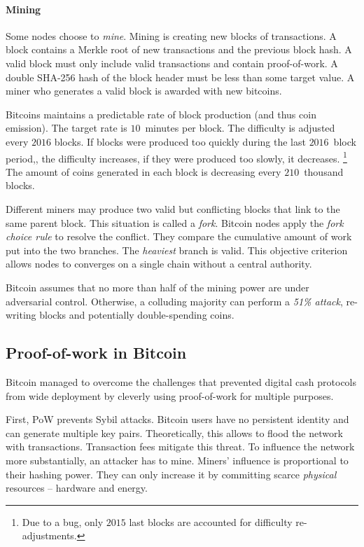 \paragraph{Mining}

Some nodes choose to \textit{mine}.
Mining is creating new blocks of transactions.
A block contains a Merkle root of new transactions and the previous block hash.
A valid block must only include valid transactions and contain proof-of-work.
A double SHA-256 hash of the block header must be less than some target value.
A miner who generates a valid block is awarded with new bitcoins.

Bitcoins maintains a predictable rate of block production (and thus coin emission).
The target rate is $10$~minutes per block.
The difficulty is adjusted every $2016$ blocks.
If blocks were produced too quickly during the last $2016$~block period,, the difficulty increases, if they were produced too slowly, it decreases.
\footnote{Due to a bug, only $2015$ last blocks are accounted for difficulty re-adjustments.}
The amount of coins generated in each block is decreasing every $210$~thousand blocks.


Different miners may produce two valid but conflicting blocks that link to the same parent block.
This situation is called a \textit{fork}.
Bitcoin nodes apply the \textit{fork choice rule} to resolve the conflict.
They compare the cumulative amount of work put into the two branches.
The \textit{heaviest} branch is valid.
This objective criterion allows nodes to converges on a single chain without a central authority.

Bitcoin assumes that no more than half of the mining power are under adversarial control.
Otherwise, a colluding majority can perform a \textit{51\% attack}, re-writing blocks and potentially double-spending coins.


\subsection{Proof-of-work in Bitcoin}

Bitcoin managed to overcome the challenges that prevented digital cash protocols from wide deployment by cleverly using proof-of-work for multiple purposes.

First, PoW prevents Sybil attacks.
Bitcoin users have no persistent identity and can generate multiple key pairs.
Theoretically, this allows to flood the network with transactions.
Transaction fees mitigate this threat.
To influence the network more substantially, an attacker has to mine.
Miners' influence is proportional to their hashing power.
They can only increase it by committing scarce \textit{physical} resources -- hardware and energy.

